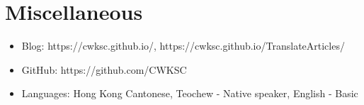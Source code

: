 \documentclass{resume}
\begin{document}
\section{Miscellaneous}
\begin{itemize}[parsep=0.5ex]
  \item Blog: https://cwksc.github.io/, https://cwksc.github.io/TranslateArticles/
  \item GitHub: https://github.com/CWKSC
  \item Languages: Hong Kong Cantonese, Teochew - Native speaker, English - Basic
\end{itemize}

%
%
\end{document}
